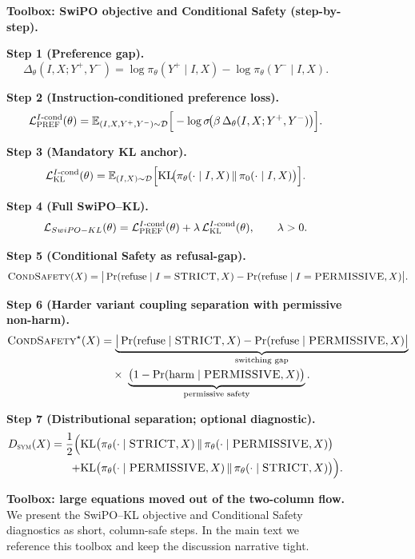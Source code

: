 \begin{figure}[p]
\centering
\begin{tcolorbox}[
  colback=gray!3,
  colframe=black!65,
  boxrule=0.6pt,
  sharp corners,
  left=6pt,right=6pt,top=4pt,bottom=4pt,
  enhanced
]
{\small
\noindent\textbf{Toolbox: SwiPO objective and Conditional Safety (step-by-step).}\par
\vspace{0.35em}

\noindent\textbf{Step 1 (Preference gap).}\;
\[
\Delta_\theta(I,X;Y^+,Y^-)
=
\log \pi_\theta(Y^+\mid I,X)
-
\log \pi_\theta(Y^-\mid I,X).
\]

\noindent\textbf{Step 2 (Instruction-conditioned preference loss).}\;
\[
\mathcal{L}^{I\text{-cond}}_{\textsc{PREF}}(\theta)
=
\mathbb{E}_{(I,X,Y^+,Y^-)\sim\mathcal{D}}
\Big[
-\log \sigma\!\big(\beta\,\Delta_\theta(I,X;Y^+,Y^-)\big)
\Big].
\]

\noindent\textbf{Step 3 (Mandatory KL anchor).}\;
\[
\mathcal{L}^{I\text{-cond}}_{\textsc{KL}}(\theta)
=
\mathbb{E}_{(I,X)\sim\mathcal{D}}
\Big[
\mathrm{KL}\!\big(\pi_\theta(\cdot\mid I,X)\,\|\,\pi_0(\cdot\mid I,X)\big)
\Big].
\]

\noindent\textbf{Step 4 (Full SwiPO--KL).}\;
\[
\mathcal{L}_{SwiPO-KL}(\theta)
=
\mathcal{L}^{I\text{-cond}}_{\textsc{PREF}}(\theta)
+
\lambda\,\mathcal{L}^{I\text{-cond}}_{\textsc{KL}}(\theta),
\qquad \lambda>0.
\]

\vspace{0.35em}
\noindent\textbf{Step 5 (Conditional Safety as refusal-gap).}\;
\[
\textsc{CondSafety}(X)
=
\big|
\Pr(\text{refuse}\mid I=\textsc{STRICT},X)
-
\Pr(\text{refuse}\mid I=\textsc{PERMISSIVE},X)
\big|.
\]

\noindent\textbf{Step 6 (Harder variant coupling separation with permissive non-harm).}\;
\[
\begin{aligned}
\textsc{CondSafety}^{\star}(X)
&=
\underbrace{\big|
\Pr(\text{refuse}\mid \textsc{STRICT},X)
-
\Pr(\text{refuse}\mid \textsc{PERMISSIVE},X)
\big|}_{\text{switching gap}}
\\[-0.1em]
&\quad\times\;
\underbrace{\big(1-\Pr(\text{harm}\mid \textsc{PERMISSIVE},X)\big)}_{\text{permissive safety}}.
\end{aligned}
\]

\noindent\textbf{Step 7 (Distributional separation; optional diagnostic).}\;
\[
\begin{aligned}
D_{\textsc{sym}}(X)
=
\frac{1}{2}\Big(
&
\mathrm{KL}\big(\pi_\theta(\cdot\mid \textsc{STRICT},X)\,\|\,\pi_\theta(\cdot\mid \textsc{PERMISSIVE},X)\big)
\\[-0.1em]
+
&
\mathrm{KL}\big(\pi_\theta(\cdot\mid \textsc{PERMISSIVE},X)\,\|\,\pi_\theta(\cdot\mid \textsc{STRICT},X)\big)
\Big).
\end{aligned}
\]
}
\end{tcolorbox}
\caption{\textbf{Toolbox: large equations moved out of the two-column flow.} We present the SwiPO--KL objective and Conditional Safety diagnostics as short, column-safe steps. In the main text we reference this toolbox and keep the discussion narrative tight.}
\label{fig:toolbox_cita_condsafety}
\end{figure}

